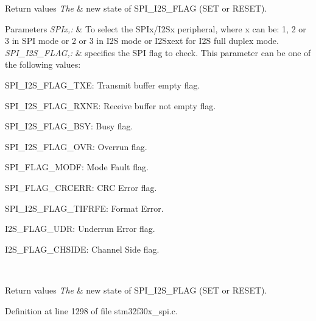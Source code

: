\begin{DoxyRetVals}{Return values}
{\em The} & new state of S\-P\-I\-\_\-\-I2\-S\-\_\-\-F\-L\-A\-G (S\-E\-T or R\-E\-S\-E\-T).\\
\hline
\end{DoxyRetVals}

\begin{DoxyParams}{Parameters}
{\em S\-P\-Ix,\-:} & To select the S\-P\-Ix/\-I2\-Sx peripheral, where x can be\-: 1, 2 or 3 in S\-P\-I mode or 2 or 3 in I2\-S mode or I2\-Sxext for I2\-S full duplex mode. \\
\hline
{\em S\-P\-I\-\_\-\-I2\-S\-\_\-\-F\-L\-A\-G,\-:} & specifies the S\-P\-I flag to check. This parameter can be one of the following values\-: \begin{DoxyItemize}
\item S\-P\-I\-\_\-\-I2\-S\-\_\-\-F\-L\-A\-G\-\_\-\-T\-X\-E\-: Transmit buffer empty flag. \item S\-P\-I\-\_\-\-I2\-S\-\_\-\-F\-L\-A\-G\-\_\-\-R\-X\-N\-E\-: Receive buffer not empty flag. \item S\-P\-I\-\_\-\-I2\-S\-\_\-\-F\-L\-A\-G\-\_\-\-B\-S\-Y\-: Busy flag. \item S\-P\-I\-\_\-\-I2\-S\-\_\-\-F\-L\-A\-G\-\_\-\-O\-V\-R\-: Overrun flag. \item S\-P\-I\-\_\-\-F\-L\-A\-G\-\_\-\-M\-O\-D\-F\-: Mode Fault flag. \item S\-P\-I\-\_\-\-F\-L\-A\-G\-\_\-\-C\-R\-C\-E\-R\-R\-: C\-R\-C Error flag. \item S\-P\-I\-\_\-\-I2\-S\-\_\-\-F\-L\-A\-G\-\_\-\-T\-I\-F\-R\-F\-E\-: Format Error. \item I2\-S\-\_\-\-F\-L\-A\-G\-\_\-\-U\-D\-R\-: Underrun Error flag. \item I2\-S\-\_\-\-F\-L\-A\-G\-\_\-\-C\-H\-S\-I\-D\-E\-: Channel Side flag. \end{DoxyItemize}
\\
\hline
\end{DoxyParams}

\begin{DoxyRetVals}{Return values}
{\em The} & new state of S\-P\-I\-\_\-\-I2\-S\-\_\-\-F\-L\-A\-G (S\-E\-T or R\-E\-S\-E\-T). \\
\hline
\end{DoxyRetVals}


Definition at line 1298 of file stm32f30x\-\_\-spi.\-c.


